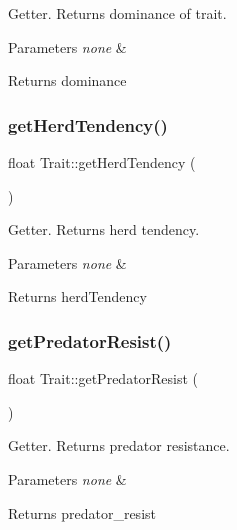 Getter. Returns dominance of trait. 
\begin{DoxyParams}{Parameters}
{\em none} & \\
\hline
\end{DoxyParams}
\begin{DoxyReturn}{Returns}
dominance 
\end{DoxyReturn}
\mbox{\label{class_trait_abc05dc8d331b54d5d9d080a2507efa39}} 
\subsubsection{\texorpdfstring{get\+Herd\+Tendency()}{getHerdTendency()}}
{\footnotesize\ttfamily float Trait\+::get\+Herd\+Tendency (\begin{DoxyParamCaption}{ }\end{DoxyParamCaption})}

Getter. Returns herd tendency. 
\begin{DoxyParams}{Parameters}
{\em none} & \\
\hline
\end{DoxyParams}
\begin{DoxyReturn}{Returns}
herd\+Tendency 
\end{DoxyReturn}
\mbox{\label{class_trait_a4275bb208c1fdcb232251d7014b7a9dc}} 
\subsubsection{\texorpdfstring{get\+Predator\+Resist()}{getPredatorResist()}}
{\footnotesize\ttfamily float Trait\+::get\+Predator\+Resist (\begin{DoxyParamCaption}{ }\end{DoxyParamCaption})}

Getter. Returns predator resistance. 
\begin{DoxyParams}{Parameters}
{\em none} & \\
\hline
\end{DoxyParams}
\begin{DoxyReturn}{Returns}
predator\+\_\+resist 
\end{DoxyReturn}
\mbox{\label{class_trait_a7bd7db0c5b950d44aff9ca4943eef187}} 
